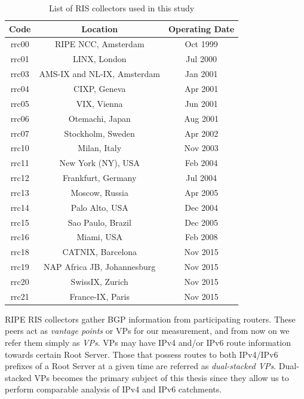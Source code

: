 \begin{table}
	\centering
	\begin{tabular}{c c c}
		\hline
		\textbf{Code} & \textbf{Location}	& \textbf{Operating Date} \\ \hline\hline
		rrc00	& RIPE NCC, Amsterdam	& Oct 1999 \\ \hline
		rrc01	& LINX, London			& Jul	 2000 \\ \hline
		rrc03	& AMS-IX and NL-IX, Amsterdam	& Jan 2001 \\ \hline
		rrc04	& CIXP, Geneva		& Apr 2001 \\ \hline
		rrc05	& VIX, Vienna		& Jun 2001 \\ \hline
		rrc06	& Otemachi, Japan	& Aug 2001 \\ \hline
		rrc07	& Stockholm, Sweden	& Apr 2002 \\ \hline
		rrc10	& Milan, Italy		& Nov 2003 \\ \hline
		rrc11	& New York (NY), USA	& Feb 2004 \\ \hline
		rrc12	& Frankfurt, Germany	& Jul 2004 \\ \hline
		rrc13	& Moscow, Russia	& Apr 2005 \\ \hline
		rrc14	& Palo Alto, USA	& Dec 2004 \\ \hline
		rrc15	& Sao Paulo, Brazil	& Dec 2005 \\ \hline
		rrc16	& Miami, USA	& Feb 2008 \\ \hline
		rrc18	& CATNIX, Barcelona	& Nov 2015 \\ \hline
		rrc19	& NAP Africa JB, Johannesburg	& Nov 2015 \\ \hline
		rrc20	& SwissIX, Zurich	& Nov 2015 \\ \hline
		rrc21	& France-IX, Paris	& Nov 2015 \\ \hline
	\end{tabular}
	\caption{List of RIS collectors used in this study}
	\label{table:ch03:ris-collectors}
\end{table}

RIPE RIS collectors gather BGP information from participating routers. These peers act as \textit{vantage points} or VPs for our measurement, and from now on we refer them simply as \textit{VPs}. VPs may have IPv4 and/or IPv6 route information towards certain Root Server. Those that possess routes to both IPv4/IPv6 prefixes of a Root Server at a given time are referred as \textit{dual-stacked VPs}. Dual-stacked VPs becomes the primary subject of this thesis since they allow us to perform comparable analysis of IPv4 and IPv6 catchments. 

